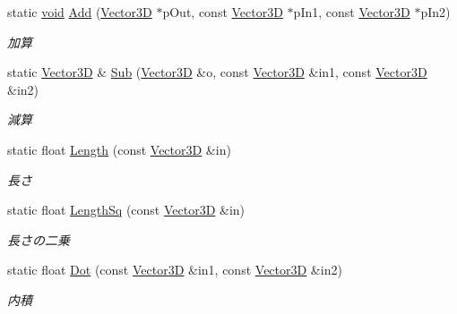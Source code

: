 \begin{DoxyCompactItemize}
\item 
static \mbox{\hyperlink{namespace_effekseer_ab34c4088e512200cf4c2716f168deb56}{void}} \mbox{\hyperlink{struct_effekseer_1_1_vector3_d_a79225e27a6ca17af79e5eca70ff44cb0}{Add}} (\mbox{\hyperlink{struct_effekseer_1_1_vector3_d}{Vector3D}} $\ast$p\+Out, const \mbox{\hyperlink{struct_effekseer_1_1_vector3_d}{Vector3D}} $\ast$p\+In1, const \mbox{\hyperlink{struct_effekseer_1_1_vector3_d}{Vector3D}} $\ast$p\+In2)
\begin{DoxyCompactList}\small\item\em 加算 \end{DoxyCompactList}\item 
static \mbox{\hyperlink{struct_effekseer_1_1_vector3_d}{Vector3D}} \& \mbox{\hyperlink{struct_effekseer_1_1_vector3_d_a7eeecc19d710f839660f1a6dcefbebb1}{Sub}} (\mbox{\hyperlink{struct_effekseer_1_1_vector3_d}{Vector3D}} \&o, const \mbox{\hyperlink{struct_effekseer_1_1_vector3_d}{Vector3D}} \&in1, const \mbox{\hyperlink{struct_effekseer_1_1_vector3_d}{Vector3D}} \&in2)
\begin{DoxyCompactList}\small\item\em 減算 \end{DoxyCompactList}\item 
static float \mbox{\hyperlink{struct_effekseer_1_1_vector3_d_addb0afd2acda6ddcad6d1a990e01ee72}{Length}} (const \mbox{\hyperlink{struct_effekseer_1_1_vector3_d}{Vector3D}} \&in)
\begin{DoxyCompactList}\small\item\em 長さ \end{DoxyCompactList}\item 
static float \mbox{\hyperlink{struct_effekseer_1_1_vector3_d_a3b861a7330d7fe64a0d7af80f7f660a8}{Length\+Sq}} (const \mbox{\hyperlink{struct_effekseer_1_1_vector3_d}{Vector3D}} \&in)
\begin{DoxyCompactList}\small\item\em 長さの二乗 \end{DoxyCompactList}\item 
static float \mbox{\hyperlink{struct_effekseer_1_1_vector3_d_a793f67e8b72956924e0717d82b41e3ea}{Dot}} (const \mbox{\hyperlink{struct_effekseer_1_1_vector3_d}{Vector3D}} \&in1, const \mbox{\hyperlink{struct_effekseer_1_1_vector3_d}{Vector3D}} \&in2)
\begin{DoxyCompactList}\small\item\em 内積 \end{DoxyCompactList}\item 

\end{DoxyCompactItemize}
